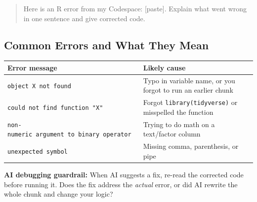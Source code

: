 \documentclass[
  letterpaper,
  DIV=11,
  numbers=noendperiod,
  oneside]{scrreprt}
\begin{document}
\begin{quote}
Here is an R error from my Codespace: {[}paste{]}. Explain what went
wrong in one sentence and give corrected code.
\end{quote}

\subsection*{Common Errors and What They
Mean}\label{common-errors-and-what-they-mean}

\begin{longtable}[]{@{}
  >{\raggedright\arraybackslash}p{}
  >{\raggedright\arraybackslash}p{}@{}}
\toprule\noalign{}
\begin{minipage}[b]{\linewidth}\raggedright
Error message
\end{minipage} & \begin{minipage}[b]{\linewidth}\raggedright
Likely cause
\end{minipage} \\
\midrule\noalign{}
\endhead
\bottomrule\noalign{}
\endlastfoot
\texttt{object\ \textquotesingle{}X\textquotesingle{}\ not\ found} &
Typo in variable name, or you forgot to run an earlier chunk \\
\texttt{could\ not\ find\ function\ "X"} & Forgot
\texttt{library(tidyverse)} or misspelled the function \\
\texttt{non-numeric\ argument\ to\ binary\ operator} & Trying to do math
on a text/factor column \\
\texttt{unexpected\ symbol} & Missing comma, parenthesis, or pipe \\
\end{longtable}

\begin{tcolorbox}[enhanced jigsaw, opacitybacktitle=0.6, colbacktitle=quarto-callout-warning-color!10!white, breakable, opacityback=0, coltitle=black, toptitle=1mm, bottomrule=.15mm, colframe=quarto-callout-warning-color-frame, bottomtitle=1mm, colback=white, leftrule=.75mm, rightrule=.15mm, title=\textcolor{quarto-callout-warning-color}{\faExclamationTriangle}\hspace{0.5em}{Warning}, left=2mm, arc=.35mm, toprule=.15mm, titlerule=0mm]

\textbf{AI debugging guardrail:} When AI suggests a fix, re-read the
corrected code before running it. Does the fix address the \emph{actual}
error, or did AI rewrite the whole chunk and change your logic?

\end{tcolorbox}
\end{document}
